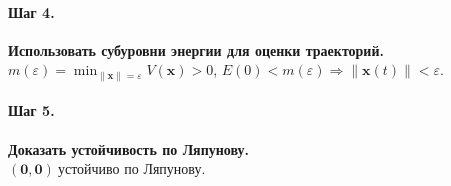 \paragraph{Шаг 4.} \textbf{Использовать субуровни энергии для оценки траекторий.}\\
\(m(\varepsilon)=\min_{\|\mathbf x\|=\varepsilon}V(\mathbf x)>0\), \(E(0)<m(\varepsilon)\Rightarrow \|\mathbf x(t)\|<\varepsilon\).

\paragraph{Шаг 5.} \textbf{Доказать устойчивость по Ляпунову.}\\
\(\boxed{(\mathbf 0,\mathbf 0)\ \text{устойчиво по Ляпунову}}\).

